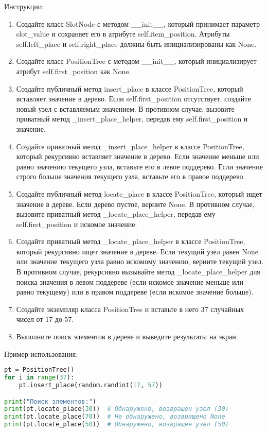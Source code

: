 \begin{enumerate}
Инструкции:
\begin{enumerate}
    \item Создайте класс SlotNode с методом \_\_init\_\_, который принимает параметр slot\_value и сохраняет его в атрибуте self.item\_position. Атрибуты self.left\_place и self.right\_place должны быть инициализированы как None.
    \item Создайте класс PositionTree с методом \_\_init\_\_, который инициализирует атрибут self.first\_position как None.
    \item Создайте публичный метод insert\_place в классе PositionTree, который вставляет значение в дерево. Если self.first\_position отсутствует, создайте новый узел с вставляемым значением. В противном случае, вызовите приватный метод \_insert\_place\_helper, передав ему self.first\_position и значение.
    \item Создайте приватный метод \_insert\_place\_helper в классе PositionTree, который рекурсивно вставляет значение в дерево. Если значение меньше или равно значению текущего узла, вставьте его в левое поддерево. Если значение строго больше значения текущего узла, вставьте его в правое поддерево.
    \item Создайте публичный метод locate\_place в классе PositionTree, который ищет значение в дереве. Если дерево пустое, верните None. В противном случае, вызовите приватный метод \_locate\_place\_helper, передав ему self.first\_position и искомое значение.
    \item Создайте приватный метод \_locate\_place\_helper в классе PositionTree, который рекурсивно ищет значение в дереве. Если текущий узел равен None или значение текущего узла равно искомому значению, верните текущий узел. В противном случае, рекурсивно вызывайте метод \_locate\_place\_helper для поиска значения в левом поддереве (если искомое значение меньше или равно текущему) или в правом поддереве (если искомое значение больше).
    \item Создайте экземпляр класса PositionTree и вставьте в него 37 случайных чисел от 17 до 57.
    \item Выполните поиск элементов в дереве и выведите результаты на экран.
\end{enumerate}

Пример использования:
\begin{lstlisting}[language=Python]
pt = PositionTree()
for i in range(37):
    pt.insert_place(random.randint(17, 57))

print("Поиск элементов:")
print(pt.locate_place(30))  # Обнаружено, возвращен узел (30)
print(pt.locate_place(70))  # Не обнаружено, возвращено None
print(pt.locate_place(50))  # Обнаружено, возвращен узел (50)
\end{lstlisting}


\end{enumerate}
